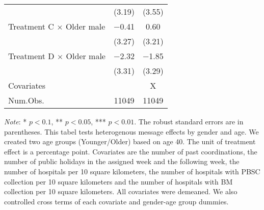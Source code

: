 \documentclass[12pt, a4paper]{article}
\begin{document}
\begin{table}[H]
\begin{threeparttable}
\begin{tabular}[t]{>{\raggedright\arraybackslash}p{20em}cc}
 & (\num{3.19}) & (\num{3.55})\\
Treatment C $\times$ Older male & \num{-0.41} & \num{0.60}\\
 & (\num{3.27}) & (\num{3.21})\\
Treatment D $\times$ Older male & \num{-2.32} & \num{-1.85}\\
 & (\num{3.31}) & (\num{3.29})\\
\midrule
Covariates &  & X\\
Num.Obs. & \num{11049} & \num{11049}\\
\bottomrule
\end{tabular}
\begin{tablenotes}
\item \emph{Note}: * $p < 0.1$, ** $p < 0.05$, *** $p < 0.01$. The robust standard errors are in parentheses. This tabel tests heterogenous message effects by gender and age. We created two age groups (Younger/Older) based on age 40. The unit of treatment effect is a percentage point. Covariates are the number of past coordinations, the number of public holidays in the assigned week and the following week, the number of hospitals per 10 square kilometers, the number of hospitals with PBSC collection per 10 square kilometers and the number of hospitals with BM collection per 10 square kilometers. All covariates were demeaned. We also controlled cross terms of each covariate and gender-age group dummies.
\end{tablenotes}
\end{threeparttable}
\end{table}
\end{document}
